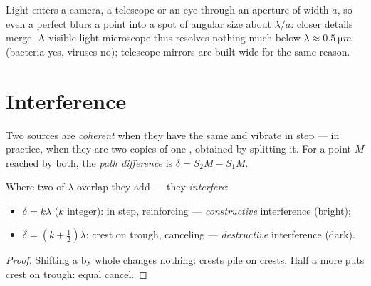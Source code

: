 \begin{remark}\label{rem:g12:light-as-wave:limits}
Light enters a camera, a telescope or an eye through an aperture of
width $a$, so even a perfect  blurs a point into a spot of
angular size about $\lambda/a$: closer details merge. A visible-light
microscope thus resolves nothing much below $\lambda \approx
\qty{0.5}{\micro m}$ (bacteria yes, viruses no); telescope mirrors
are built wide for the same reason.
\end{remark}

\section{Interference}

\begin{definition}\label{def:g12:light-as-wave:coherent}
Two  sources are \emph{coherent} when
they have the same  and vibrate in step --- in practice,
when they are two copies of one , obtained by splitting it. For a
point $M$ reached by both, the \emph{path difference}%
 is $\delta = S_2M - S_1M$.
\end{definition}

\begin{proposition}\label{prop:g12:light-as-wave:conditions}
Where two   of  $\lambda$ overlap they add ---
they \emph{interfere}:
\begin{itemize}
  \item $\delta = k\lambda$ ($k$ integer): in step, reinforcing ---
        \emph{constructive} interference (bright);
  \item $\delta = (k + \tfrac12)\lambda$: crest on trough, canceling
        --- \emph{destructive} interference (dark).
\end{itemize}
\end{proposition}

\begin{proof}
Shifting a  by whole  changes nothing: crests
pile on crests. Half a  more puts crest on trough: equal
 cancel.
\end{proof}

